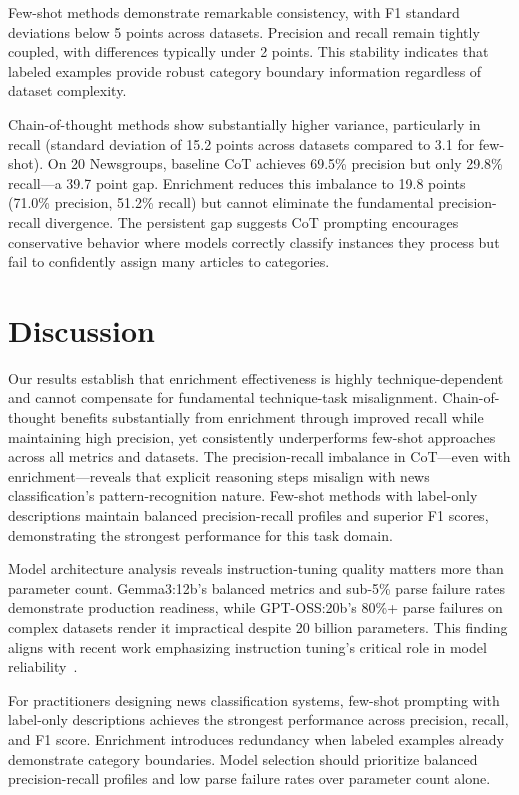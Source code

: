 \documentclass[sigconf,nonacm]{acmart}
\begin{document}
Few-shot methods demonstrate remarkable consistency, with F1 standard deviations below 5 points across datasets. Precision and recall remain tightly coupled, with differences typically under 2 points. This stability indicates that labeled examples provide robust category boundary information regardless of dataset complexity.

Chain-of-thought methods show substantially higher variance, particularly in recall (standard deviation of 15.2 points across datasets compared to 3.1 for few-shot). On 20 Newsgroups, baseline CoT achieves 69.5\% precision but only 29.8\% recall—a 39.7 point gap. Enrichment reduces this imbalance to 19.8 points (71.0\% precision, 51.2\% recall) but cannot eliminate the fundamental precision-recall divergence. The persistent gap suggests CoT prompting encourages conservative behavior where models correctly classify instances they process but fail to confidently assign many articles to categories.

\section{Discussion}

Our results establish that enrichment effectiveness is highly technique-dependent and cannot compensate for fundamental technique-task misalignment. Chain-of-thought benefits substantially from enrichment through improved recall while maintaining high precision, yet consistently underperforms few-shot approaches across all metrics and datasets. The precision-recall imbalance in CoT—even with enrichment—reveals that explicit reasoning steps misalign with news classification's pattern-recognition nature. Few-shot methods with label-only descriptions maintain balanced precision-recall profiles and superior F1 scores, demonstrating the strongest performance for this task domain.

Model architecture analysis reveals instruction-tuning quality matters more than parameter count. Gemma3:12b's balanced metrics and sub-5\% parse failure rates demonstrate production readiness, while GPT-OSS:20b's 80\%+ parse failures on complex datasets render it impractical despite 20 billion parameters. This finding aligns with recent work emphasizing instruction tuning's critical role in model reliability~\cite{zhang2023instruction, gretz2023zero}.

For practitioners designing news classification systems, few-shot prompting with label-only descriptions achieves the strongest performance across precision, recall, and F1 score. Enrichment introduces redundancy when labeled examples already demonstrate category boundaries. Model selection should prioritize balanced precision-recall profiles and low parse failure rates over parameter count alone.
\end{document}

